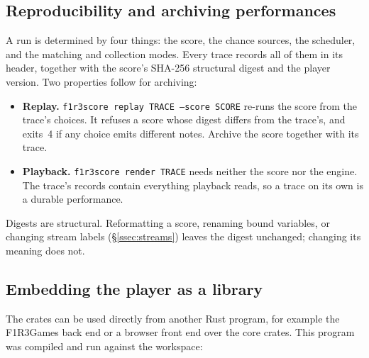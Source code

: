 \documentclass[11pt,a4paper]{article}
\newcommand{\ttx}[1]{\texttt{#1}}
\begin{document}
\subsection{Reproducibility and archiving performances}

A run is determined by four things: the score, the chance sources, the
scheduler, and the matching and collection modes. Every trace records all of
them in its header, together with the score's SHA-256 structural digest and
the player version. Two properties follow for archiving:
\begin{itemize}
\item \textbf{Replay.} \ttx{f1r3score replay TRACE --score SCORE} re-runs the
  score from the trace's choices. It refuses a score whose digest differs from
  the trace's, and exits~4 if any choice emits different notes. Archive the
  score together with its trace.
\item \textbf{Playback.} \ttx{f1r3score render TRACE} needs neither the score
  nor the engine. The trace's records contain everything playback reads, so a
  trace on its own is a durable performance.
\end{itemize}
Digests are structural. Reformatting a score, renaming bound variables, or
changing stream labels (\S\ref{ssec:streams}) leaves the digest unchanged;
changing its meaning does not.

\subsection{Embedding the player as a library}

The crates can be used directly from another Rust program, for example the
F1R3Games back end or a browser front end over the core crates. This program
was compiled and run against the workspace:
\end{document}
